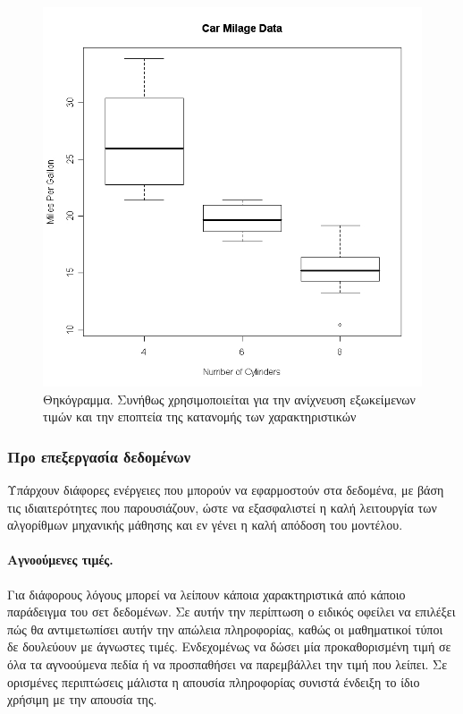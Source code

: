 \documentclass{article}
\begin{document}
\begin{figure}[H]
\begin{minipage}{.5\textwidth}
    \end{minipage}%
    \begin{minipage}{0.5\textwidth}
        \centering
        \includegraphics[width=0.8\linewidth, height=0.15\textheight]{boxplot.png}
        \caption[Θηκόγραμμα]{Θηκόγραμμα. Συνήθως χρησιμοποιείται για την ανίχνευση εξωκείμενων τιμών
και την εποπτεία της κατανομής των χαρακτηριστικών}
       
    \end{minipage}
\end{figure}

\subsubsection{Προ επεξεργασία δεδομένων}
Υπάρχουν διάφορες ενέργειες που μπορούν να εφαρμοστούν στα δεδομένα, με βάση τις ιδιαιτερότητες που παρουσιάζουν, ώστε να εξασφαλιστεί η καλή λειτουργία των αλγορίθμων μηχανικής μάθησης και εν γένει η καλή απόδοση του μοντέλου.

\paragraph{Αγνοούμενες τιμές.} Για διάφορους λόγους μπορεί να λείπουν κάποια χαρακτηριστικά από κάποιο παράδειγμα του σετ δεδομένων. Σε αυτήν την περίπτωση ο ειδικός οφείλει να επιλέξει πώς θα αντιμετωπίσει αυτήν την απώλεια πληροφορίας, καθώς οι μαθηματικοί τύποι δε δουλεύουν με άγνωστες τιμές. Ενδεχομένως να δώσει μία προκαθορισμένη τιμή σε όλα τα αγνοούμενα πεδία ή να προσπαθήσει να παρεμβάλλει την τιμή που λείπει. Σε ορισμένες περιπτώσεις μάλιστα η απουσία πληροφορίας συνιστά ένδειξη το ίδιο χρήσιμη με την απουσία της.
\end{document}
